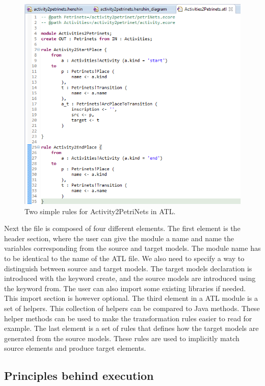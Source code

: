 \documentclass[pdftex,11pt,a4paper]{article}
\begin{document}
\begin{figure}[H]
	\centering
	\includegraphics[scale=0.5]{figures/ATLScreen.png}
	\caption{Two simple rules for Activity2PetriNets in ATL.}
	\label{fig:ATL_Screen}
\end{figure}

Next the
file is composed of four different elements. The first element is the header
section, where the user can give the module a name and name the variables
corresponding from the source and target models. The module name has to be
identical to the name of the ATL file. We also need to specify a way to
distinguish between source and target models. The target models declaration is
introduced with the keyword create, and the source models are introduced using
the keyword from. The user can also import some existing libraries if needed.
This import section is however optional. The third element in a ATL module is a
set of helpers. This collection of helpers can be compared to Java methods.
These helper methods can be used to make the transformation rules easier to read
for example. The last element is a set of rules that defines how the target
models are generated from the source models. These rules are used to implicitly
match source elements and produce target elements. 

\subsection{Principles behind execution}
\end{document}
